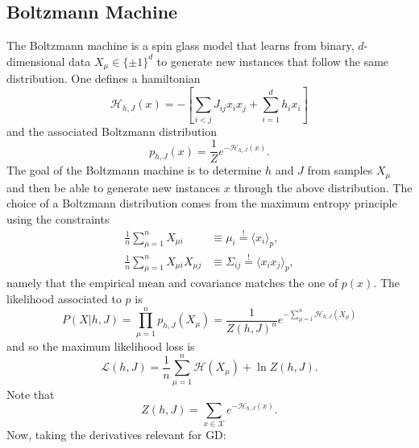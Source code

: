 \documentclass{article}
\begin{document}
\subsection{Boltzmann Machine}
The Boltzmann machine is a spin glass model that learns from binary, $d$-dimensional data $X_{\mu}\in \{\pm 1\}^d$ to generate new instances that follow the same distribution. One defines a hamiltonian
\begin{equation}
    \mathcal{H}_{h,J}(x)
    =
    -\left[
        \sum_{i<j} J_{ij} x_ix_j
        +
        \sum_{i=1}^{d} h_ix_i
    \right]
\end{equation}
and the associated Boltzmann distribution
\begin{equation}
    p_{h,J}(x)
    =
    \frac{1}{Z}
    e^{-\mathcal{H}_{h,J}(x)}.
\end{equation}
The goal of the Boltzmann machine is to determine $h$ and $J$ from samples $X_{\mu}$ and then be able to generate new instances $x$ through the above distribution. The choice of a Boltzmann distribution comes from the maximum entropy principle using the constraints
\begin{align}
    \frac{1}{n}\sum_{\mu=1}^{n}
    X_{\mu i}
    &\equiv \mu_i
    \overset{!}{=}
    \langle x_i \rangle_p, \\
    \frac{1}{n}\sum_{\mu=1}^{n}
    X_{\mu i} X_{\mu j}
    &\equiv  \Sigma_{ij} 
    \overset{!}{=}
    \langle x_ix_j \rangle_p,
    \label{eq:boltzmannconstr}
\end{align}
namely that the empirical mean and covariance matches the one of $p(x)$.
The likelihood associated to $p$ is
\begin{equation}
    P(X|h,J)
    =
    \prod_{\mu=1}^{n}
    p_{h,J}(X_{\mu})
    =
    \frac{1}{Z(h,J)^n}
    e^{-\sum_{\mu=1}^{n}\mathcal{H}_{h,J}(X_{\mu})}
\end{equation}
and so the maximum likelihood loss is
\begin{equation}
    \mathcal{L}(h,J)
    =
    \frac{1}{n}
    \sum_{\mu=1}^{n}\mathcal{H}(X_{\mu})
    +
    \ln{Z(h,J)}.
\end{equation}
Note that
\begin{equation}
    Z(h,J)
    =
    \sum_{x\in\mathcal{X}}
    e^{-\mathcal{H}_{h,J}(x)}.
\end{equation}
Now, taking the derivatives relevant for GD:
\end{document}
